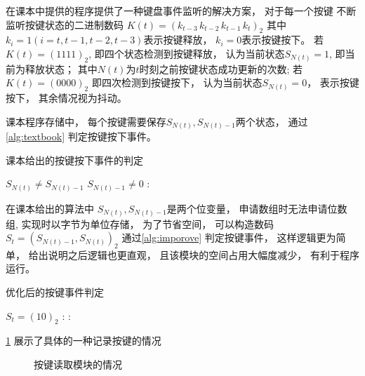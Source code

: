 \documentclass[../main.tex]{subfiles} %
\begin{document}
在课本中提供的程序提供了一种键盘事件监听的解决方案，
对于每一个按键
不断监听按键状态的二进制数码
$K(t) = (k_{t-3}\,  k_{t-2}\, k_{t-1} \,k_t)_2$
其中$k_i = 1(i=t,t-1,t-2,t-3)$表示按键释放，
$k_i = 0$表示按键按下。
若$K(t) = (1111)_2$,
即四个状态检测到按键释放，
认为当前状态$S_{N(t)}=1$,
即当前为释放状态；
其中$N(t)$为$t$时刻之前按键状态成功更新的次数;
若$K(t) = (0000)_2$
即四次检测到按键按下，
认为当前状态$S_{N(t)} = 0$，
表示按键按下，
其余情况视为抖动。

课本程序存储中，
每个按键需要保存$S_{N(t)},S_{N(t)-1}$两个状态，
通过
\cref{alg:textbook}
判定按键按下事件。

\begin{algorithm}[H]
  \caption{课本给出的按键按下事件的判定}
  \begin{codebox}
      \li \If $S_{N(t)} \neq S_{N(t)-1}$ 
        $S_{N(t)-1} \neq 0$ :
      \Then
        \li \Return {}
      \li \Else
        \li \Return {}
      \End

  \end{codebox}
  \label{alg:textbook}
\end{algorithm}

在课本给出的算法中
$S_{N(t)},S_{N(t)-1}$是两个位变量，
申请数组时无法申请位数组,
实现时以字节为单位存储，
为了节省空间，
可以构造数码$S_t = (S_{N(t)-1}, S_{N(t)})_2$
通过\cref{alg:imporove}
判定按键事件，
这样逻辑更为简单，
给出说明之后逻辑也更直观，
且该模块的空间占用大幅度减少，
有利于程序运行。

\begin{algorithm}[H]
  \caption{优化后的按键事件判定}
  \begin{codebox}
      \li \If $S_t = (10)_2$ :
      \Then
        \li \Return {}
      \li \Else:
        \li \Return {}
      \End
  \end{codebox}
  \label{alg:imporove}
\end{algorithm}

\cref{fig:key_listen}%
展示了具体的一种记录按键的情况

\begin{figure}[H]
  \centering
  \def\svgwidth{\linewidth}
  
  \caption{按键读取模块的情况}
  \label{fig:key_listen}
\end{figure}
\end{document}
